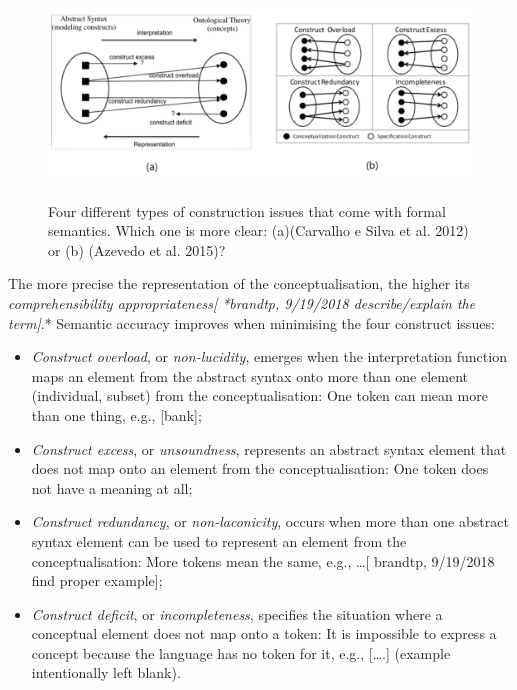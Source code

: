 \documentclass[a4paper,11pt,oneside,oldfontcommands]{memoir}
\theoremstyle{definition}
\theoremstyle{break}		%
\numberwithin{equation}{chapter}
\numberwithin{figure}{chapter}
\begin{document}
\begin{figure}
\hypertarget{fig:construct-issues}{%
\centering
\includegraphics[width=5.55208in,height=2.1875in]{src/images/ConstructIssues.png}
\caption{Four different types of construction issues that come with
formal semantics. Which one is more clear: (a)(Carvalho e Silva et al.
2012) or (b) (Azevedo et al. 2015)?}\label{fig:construct-issues}
}
\end{figure}

The more precise the representation of the conceptualisation, the higher
its \emph{comprehensibility appropriateness{[} *brandtp, 9/19/2018
describe/explain the term{]}}.* Semantic accuracy improves when
minimising the four construct issues:

\begin{itemize}
\tightlist
\item
  \emph{Construct overload}, or \emph{non-lucidity}, emerges when the
  interpretation function maps an element from the abstract syntax onto
  more than one element (individual, subset) from the conceptualisation:
  One token can mean more than one thing, e.g., {[}\textbar{}bank{]};
\item
  \emph{Construct excess}, or \emph{unsoundness}, represents an abstract
  syntax element that does not map onto an element from the
  conceptualisation: One token does not have a meaning at all;
\item
  \emph{Construct redundancy}, or \emph{non-laconicity}, occurs when
  more than one abstract syntax element can be used to represent an
  element from the conceptualisation: More tokens mean the same, e.g.,
  \ldots{}{[} brandtp, 9/19/2018 find proper example{]};
\item
  \emph{Construct deficit}, or \emph{incompleteness}, specifies the
  situation where a conceptual element does not map onto a token: It is
  impossible to express a concept because the language has no token for
  it, e.g., {[}\textbar{}\ldots{}.{]} (example intentionally left
  blank).
\end{itemize}
\end{document}
